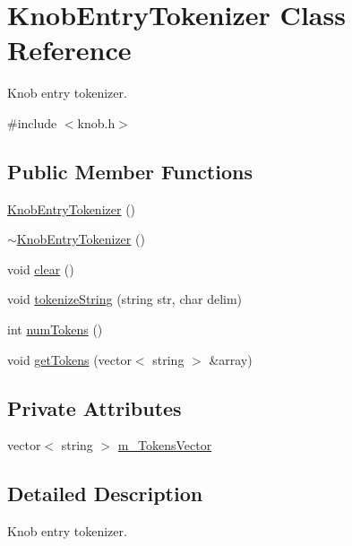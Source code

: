 \hypertarget{classKnobEntryTokenizer}{
\section{KnobEntryTokenizer Class Reference}
\label{classKnobEntryTokenizer}
}


Knob entry tokenizer.  




{\ttfamily \#include $<$knob.h$>$}

\subsection*{Public Member Functions}
\begin{DoxyCompactItemize}
\item 
\hyperlink{classKnobEntryTokenizer_a1e77007aa8ef63da3f47f35d5d334781}{KnobEntryTokenizer} ()
\item 
\hyperlink{classKnobEntryTokenizer_ad5ab3ed37b61ec64cce3bc7b3710e466}{$\sim$KnobEntryTokenizer} ()
\item 
void \hyperlink{classKnobEntryTokenizer_a2ca3913b5925a8adfccbcfe206d6efd9}{clear} ()
\item 
void \hyperlink{classKnobEntryTokenizer_a1c88bc413182ae8d4a19192b9b7aa9d3}{tokenizeString} (string str, char delim)
\item 
int \hyperlink{classKnobEntryTokenizer_a58757160e7390b739f9f30ebe4e71d2e}{numTokens} ()
\item 
void \hyperlink{classKnobEntryTokenizer_a829e9f9a136b8c02b37fd2fc27b820db}{getTokens} (vector$<$ string $>$ \&array)
\end{DoxyCompactItemize}
\subsection*{Private Attributes}
\begin{DoxyCompactItemize}
\item 
vector$<$ string $>$ \hyperlink{classKnobEntryTokenizer_a62122ee60a897f0b14c1c10aebef4045}{m\_\-TokensVector}
\end{DoxyCompactItemize}


\subsection{Detailed Description}
Knob entry tokenizer. 


